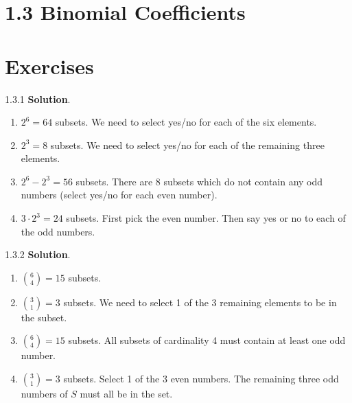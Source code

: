 \documentclass[11pt,]{book}
\theoremstyle{ptxplainnotitle}
\theoremstyle{ptxplaintitle}
\theoremstyle{ptxdefinitionnotitle}
\theoremstyle{ptxdefinitiontitle}
\theoremstyle{ptxdefinitionnotitle}
\theoremstyle{ptxdefinitiontitle}
\theoremstyle{ptxdefinitionnotitle}
\theoremstyle{ptxdefinitiontitle}
\theoremstyle{ptxdefinitiontitlenonumber}
\theoremstyle{ptxdefinitiontitlenonumber}
\numberwithin{equation}{chapter}
\begin{document}
\section*{1.3 Binomial Coefficients}
\section*{Exercises}
\begin{divisionexercise}{1.3.1}
\textbf{Solution}.\quad%
\hypertarget{p-1325}{}%
\leavevmode%
\begin{enumerate}[label=\alph*.]
\item\hypertarget{li-565}{}\hypertarget{p-1326}{}%
\(2^6 = 64\) subsets. We need to select yes/no for each of the six elements.%
\item\hypertarget{li-566}{}\hypertarget{p-1327}{}%
\(2^3 = 8\) subsets.  We need to select yes/no for each of the remaining three elements.%
\item\hypertarget{li-567}{}\hypertarget{p-1328}{}%
\(2^6 - 2^3 = 56\) subsets.  There are 8 subsets which do not contain any odd numbers (select yes/no for each even number).%
\item\hypertarget{li-568}{}\hypertarget{p-1329}{}%
\(3\cdot 2^3 = 24\) subsets.  First pick the even number.  Then say yes or no to each of the odd numbers.%
\end{enumerate}
%
\end{divisionexercise}%
\begin{divisionexercise}{1.3.2}
\textbf{Solution}.\quad%
\hypertarget{p-1347}{}%
\leavevmode%
\begin{enumerate}[label=\alph*.]
\item\hypertarget{li-581}{}\hypertarget{p-1348}{}%
\({6\choose 4} = 15\) subsets.%
\item\hypertarget{li-582}{}\hypertarget{p-1349}{}%
\({3 \choose 1} = 3\) subsets.  We need to select 1 of the 3 remaining elements to be in the subset.%
\item\hypertarget{li-583}{}\hypertarget{p-1350}{}%
\({6 \choose 4} = 15\) subsets.  All subsets of cardinality 4 must contain at least one odd number.%
\item\hypertarget{li-584}{}\hypertarget{p-1351}{}%
\({3 \choose 1} = 3\) subsets.  Select 1 of the 3 even numbers.  The remaining three odd numbers of \(S\) must all be in the set.%
\end{enumerate}
%
\end{divisionexercise}%
\end{document}
